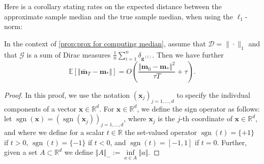 \documentclass[10pt]{article} %
\renewcommand{\vec}[1]{\bm{#1}}
\newcommand{\bg}{\bm{g}}
\DeclareMathOperator{\sgn}{sgn}
\newcommand{\R}{\mathbb{R}}
\begin{document}
Here is a corollary stating rates on the expected distance between the approximate sample median and the true sample median, when using the $\ell_1$-norm:

\begin{corollary}
    In the context of \cref{prop:prox for computing median}, assume that $\mathcal{D}= \|\cdot\|_1$ and that $\mathcal{G}$ is a sum of Dirac measures $\tfrac{1}{n}\sum_{i=1}^n \delta_{\bg^{(i)}}$.
    Then we have further
    \begin{equation*}
        \mathbb{E}\left[ \Vert \bar{\vec{m}}_T - \vec{m}_* \Vert \right] = O \left( \frac{\Vert \vec{m}_0 - \vec{m}_* \Vert^2}{\tau T} + \tau \right).
    \end{equation*}
\end{corollary}


\begin{proof}
    In this proof, we use the notation $(\vec{x}_j)_{j=1,\ldots,d}$ to specify the indivdual components of a vector $\vec{x}\in \R^d$.
    For $\vec{x} \in \mathbb{R}^d$, we define the sign operator as follows: let $\sgn(\vec{x}) = (\sgn(\vec{x}_j))_{j=1,\ldots,d}$, where $\vec{x}_j$ is the $j$-th coordinate of $\vec{x} \in \R^d$, and where we define for a scalar $t\in \R$ the set-valued operator $\sgn(t) = \{+1\}$ if $t>0$, $\sgn(t) = \{-1\}$ if $t<0$, and $\sgn(t) = [-1,1]$ if $t=0$.
    Further, given a set $A \subset \mathbb{R}^d$ we define $\Vert A \Vert_- := \inf\limits_{ a \in A} \Vert a \Vert$.


\end{proof}
\end{document}
